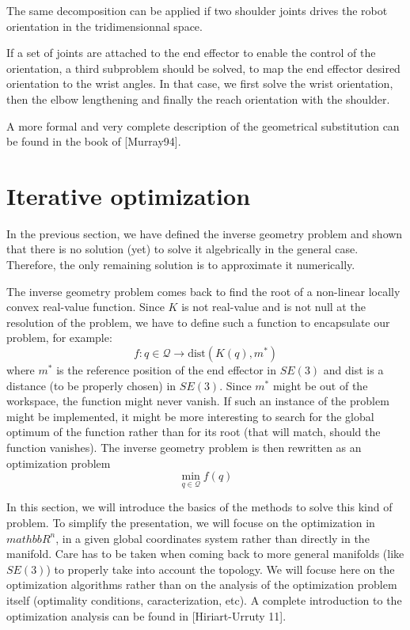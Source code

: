 \documentclass{book}
\begin{document}
The same decomposition can be applied if two shoulder joints drives the robot orientation in the tridimensionnal space. 

If a set of joints are attached to the end effector to enable the control of the orientation, a third subproblem should be solved, to map the end effector desired orientation to the wrist angles. In that case, we first solve the wrist orientation, then the elbow lengthening and finally the reach orientation with the shoulder.

A more formal and very complete description of the geometrical substitution can be found in the book of [Murray94].


\section{Iterative optimization} \label{sec:numeric}

In the previous section, we have defined the inverse geometry problem and shown that there is no solution (yet) to solve it algebrically in the general case. Therefore, the only remaining solution is to approximate it numerically.

The inverse geometry problem comes back to find the root of a non-linear locally convex real-value function. Since $K$ is not real-value and is not null at the resolution of the problem, we have to define such a function to encapsulate our problem, for example:
\[ f: q \in \mathcal{Q}  \rightarrow \textrm{dist}(K(q),m^*)  \]
where $m^*$ is the reference position of the end effector in $SE(3)$ and dist is a distance (to be properly chosen) in $SE(3)$. Since $m^*$ might be out of the workspace, the function might never vanish. If such an instance of the problem might be implemented, it might be more interesting to search for the global optimum of the function rather than for its root (that will match, should the function vanishes). The inverse geometry problem is then rewritten as an optimization problem
\[  \min_{q \in \mathcal{Q}} f(q) \]

In this section, we will introduce the basics of the methods to solve this kind of problem. To simplify the presentation, we will focuse on the optimization in $mathbb{R}^n$, \mie in a given global coordinates system rather than directly in the manifold. Care has to be taken when coming back to more general manifolds (like $SE(3)$) to properly take into account the topology. We will focuse here on the optimization algorithms rather than on the analysis of the optimization problem itself (optimality conditions, caracterization, etc). A complete introduction to the optimization analysis can be found in [Hiriart-Urruty 11].
\end{document}

